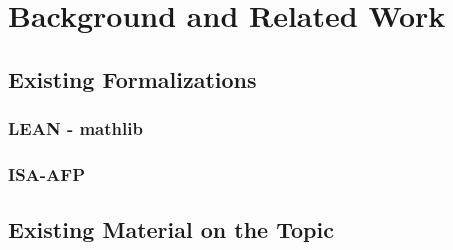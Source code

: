 
\chapter{Background and Related Work}\label{chapter:background}

\section{Existing Formalizations}
\subsection{LEAN - mathlib}
\subsection{ISA-AFP}
\section{Existing Material on the Topic}
